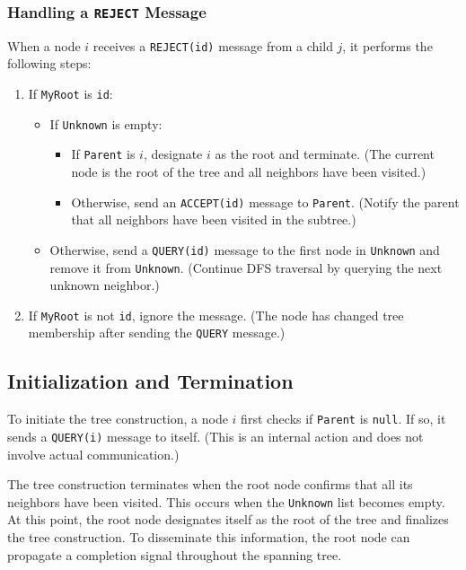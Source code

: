 \subsubsection{Handling a \texttt{REJECT} Message}
When a node \(i\) receives a \texttt{REJECT(id)} message from a child \(j\), it performs the following steps:
\begin{enumerate}
    \item If \texttt{MyRoot} is \texttt{id}:
    \begin{itemize}
        \item If \texttt{Unknown} is empty:
        \begin{itemize}
            \item If \texttt{Parent} is \(i\), designate \(i\) as the root and terminate. (The current node is the root of the tree and all neighbors have been visited.)
            \item Otherwise, send an \texttt{ACCEPT(id)} message to \texttt{Parent}. (Notify the parent that all neighbors have been visited in the subtree.)
        \end{itemize}
        \item Otherwise, send a \texttt{QUERY(id)} message to the first node in \texttt{Unknown} and remove it from \texttt{Unknown}. (Continue DFS traversal by querying the next unknown neighbor.)
    \end{itemize}
    \item If \texttt{MyRoot} is not \texttt{id}, ignore the message. (The node has changed tree membership after sending the \texttt{QUERY} message.)
\end{enumerate}

\subsection{Initialization and Termination}
To initiate the tree construction, a node \(i\) first checks if \texttt{Parent} is \texttt{null}. If so, it sends a \texttt{QUERY(i)} message to itself. (This is an internal action and does not involve actual communication.)

The tree construction terminates when the root node confirms that all its neighbors have been visited. This occurs when the \texttt{Unknown} list becomes empty. At this point, the root node designates itself as the root of the tree and finalizes the tree construction. To disseminate this information, the root node can propagate a completion signal throughout the spanning tree.